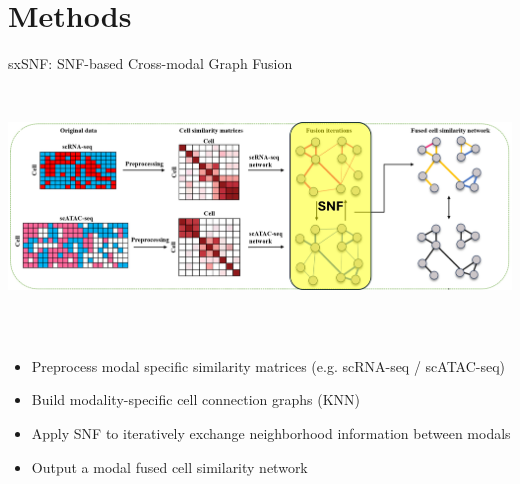 \documentclass{beamer}
\begin{document}
\section{Methods}



\begin{frame}{sxSNF: SNF-based Cross-modal Graph Fusion}
\vspace{0.1cm}
\centering
\includegraphics[width=1.0\textwidth,height=7cm,keepaspectratio]{./sxSNF_figure/Fig3a.jpg}

\vspace{0.1cm}

\scriptsize
\begin{itemize}
  \item Preprocess modal specific similarity matrices (e.g. scRNA-seq / scATAC-seq)
  \item Build modality-specific cell connection graphs (KNN)
  \item Apply SNF to iteratively exchange neighborhood information between modals
  \item Output a modal fused cell similarity network
\end{itemize}

\end{frame}
\end{document}
